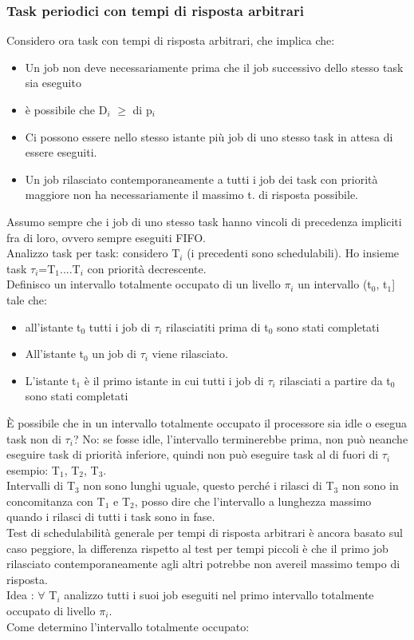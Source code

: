 \documentclass[12pt, oneside]{extbook}
\begin{document}
\subsubsection{Task periodici con tempi di risposta arbitrari}
Considero ora task con tempi di risposta arbitrari, che implica che: 
\begin{itemize}
\item Un job non deve necessariamente prima che il job successivo dello stesso task sia eseguito
\item è possibile che D$_{i}$ $\geq$ di p$_{i}$
\item Ci possono essere nello stesso istante più job di uno stesso task in attesa di essere eseguiti.
\item Un job rilasciato contemporaneamente a tutti i job dei task con priorità maggiore non ha necessariamente il massimo t. di risposta possibile.
\end{itemize}
Assumo sempre che i job di uno stesso task hanno vincoli di precedenza impliciti fra di loro, ovvero sempre eseguiti FIFO.\\ Analizzo task per task: considero T$_{i}$ (i precedenti sono schedulabili). Ho insieme task $\tau_{i}$=T$_{1}$....T$_{i}$ con priorità decrescente. \\Definisco un intervallo totalmente occupato di un livello $\pi_{i}$ un intervallo (t$_{0}$, t$_{1}$] tale che:
\begin{itemize}
\item all'istante t$_{0}$ tutti i job di $\tau_{i}$ rilasciatiti prima di t$_{0}$ sono stati completati
\item All'istante t$_{0}$ un job di $\tau_{i}$ viene rilasciato.
\item L'istante t$_{1}$ è il primo istante in cui tutti i job di $\tau_{i}$ rilasciati a partire da t$_{0}$ sono stati completati
\end{itemize}
È possibile che in un intervallo totalmente occupato il processore sia idle o esegua task non di $\tau_{i}$? No: se fosse idle, l'intervallo terminerebbe prima, non può neanche eseguire task di priorità inferiore, quindi non può eseguire task al di fuori di $\tau_{i}$\\
esempio: T$_{1}$, T$_{2}$, T$_{3}$.\\ Intervalli di T$_{3}$ non sono lunghi uguale, questo perché i rilasci di T$_{3}$ non sono in concomitanza con T$_{1}$ e T$_{2}$, posso dire che l'intervallo a lunghezza massimo quando i rilasci di tutti i task sono in fase.\\ Test di schedulabilità generale per tempi di risposta arbitrari è ancora basato sul caso peggiore, la differenza rispetto al test per tempi piccoli è che il primo job rilasciato contemporaneamente agli altri potrebbe non avereil massimo tempo di risposta.\\ Idea : $\forall$ T$_{i}$ analizzo tutti i suoi job eseguiti nel primo intervallo totalmente occupato di livello $\pi_{i}$. \\ Come determino l'intervallo totalmente occupato: 
\end{document}
